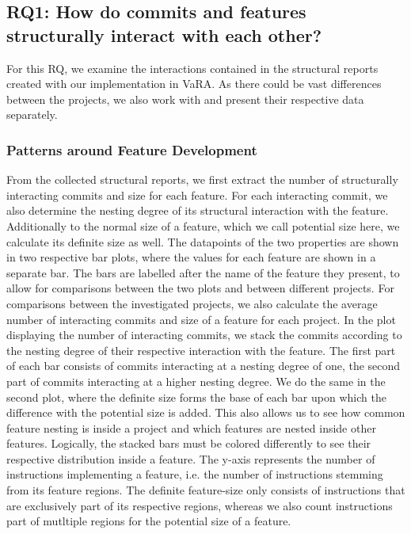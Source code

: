 \subsection*{\textbf{RQ1: How do commits and features structurally interact with each other?}}

For this RQ, we examine the interactions contained in the structural reports created with our implementation in VaRA.
As there could be vast differences between the projects, we also work with and present their respective data separately.

\subsubsection*{Patterns around Feature Development}

From the collected structural reports, we first extract the number of structurally interacting commits and size for each feature.
For each interacting commit, we also determine the nesting degree of its structural interaction with the feature.
Additionally to the normal size of a feature, which we call \textsf{potential} size here, we calculate its \textsf{definite} size as well. 
The datapoints of the two properties are shown in two respective bar plots, where the values for each feature are shown in a separate bar.
The bars are labelled after the name of the feature they present, to allow for comparisons between the two plots and between different projects.
For comparisons between the investigated projects, we also calculate the average number of interacting commits and size of a feature for each project.
In the plot displaying the number of interacting commits, we stack the commits according to the nesting degree of their respective interaction with the feature.
The first part of each bar consists of commits interacting at a nesting degree of one, the second part of commits interacting at a higher nesting degree.
We do the same in the second plot, where the definite size forms the base of each bar upon which the difference with the potential size is added.
This also allows us to see how common feature nesting is inside a project and which features are nested inside other features.
Logically, the stacked bars must be colored differently to see their respective distribution inside a feature.
The y-axis represents the number of instructions implementing a feature, i.e. the number of instructions stemming from its feature regions.
The definite feature-size only consists of instructions that are exclusively part of its respective regions, whereas we also count instructions part of mutltiple regions for the potential size of a feature.
